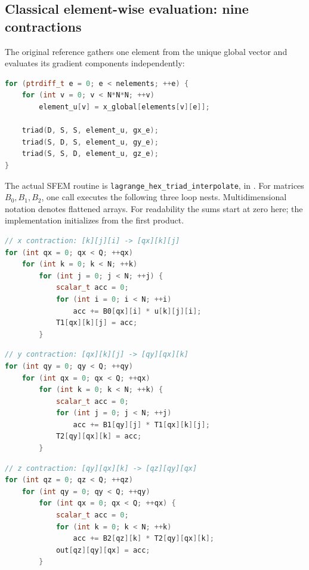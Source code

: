 \documentclass[11pt]{article}
\begin{document}
\subsection{Classical element-wise evaluation: nine contractions}

The original reference gathers one element from the unique global vector and
evaluates its gradient components independently:
\begin{lstlisting}[language=C++]
for (ptrdiff_t e = 0; e < nelements; ++e) {
    for (int v = 0; v < N*N*N; ++v)
        element_u[v] = x_global[elements[v][e]];

    triad(D, S, S, element_u, gx_e);
    triad(S, D, S, element_u, gy_e);
    triad(S, S, D, element_u, gz_e);
}
\end{lstlisting}
The actual SFEM routine is \texttt{lagrange\_hex\_triad\_interpolate}, in
.
For matrices \(B_0,B_1,B_2\), one call executes the following three loop nests.
Multidimensional notation denotes flattened arrays. For readability the sums
start at zero here; the implementation initializes from the first product.

\noindent\begin{minipage}{\linewidth}
\begin{lstlisting}[language=C++]
// x contraction: [k][j][i] -> [qx][k][j]
for (int qx = 0; qx < Q; ++qx)
    for (int k = 0; k < N; ++k)
        for (int j = 0; j < N; ++j) {
            scalar_t acc = 0;
            for (int i = 0; i < N; ++i)
                acc += B0[qx][i] * u[k][j][i];
            T1[qx][k][j] = acc;
        }
\end{lstlisting}
\end{minipage}
\par\medskip

\noindent\begin{minipage}{\linewidth}
\begin{lstlisting}[language=C++]
// y contraction: [qx][k][j] -> [qy][qx][k]
for (int qy = 0; qy < Q; ++qy)
    for (int qx = 0; qx < Q; ++qx)
        for (int k = 0; k < N; ++k) {
            scalar_t acc = 0;
            for (int j = 0; j < N; ++j)
                acc += B1[qy][j] * T1[qx][k][j];
            T2[qy][qx][k] = acc;
        }
\end{lstlisting}
\end{minipage}
\par\medskip

\noindent\begin{minipage}{\linewidth}
\begin{lstlisting}[language=C++]
// z contraction: [qy][qx][k] -> [qz][qy][qx]
for (int qz = 0; qz < Q; ++qz)
    for (int qy = 0; qy < Q; ++qy)
        for (int qx = 0; qx < Q; ++qx) {
            scalar_t acc = 0;
            for (int k = 0; k < N; ++k)
                acc += B2[qz][k] * T2[qy][qx][k];
            out[qz][qy][qx] = acc;
        }
\end{lstlisting}
\end{minipage}
\end{document}
